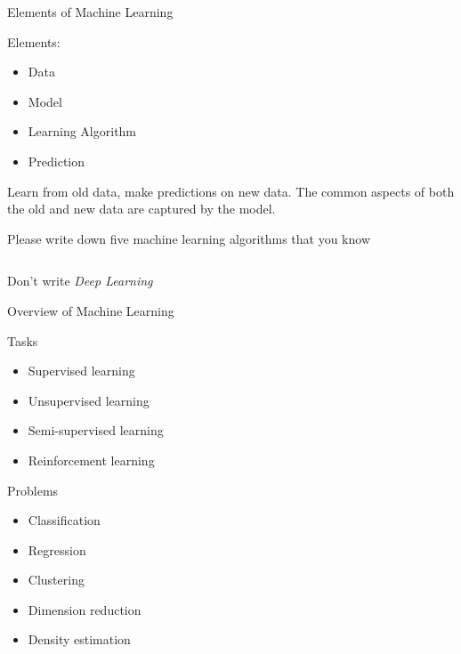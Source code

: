 \documentclass{beamer}
\newenvironment{witemize}{\itemize\addtolength{\itemsep}{15pt}}{\enditemize}
\begin{document}


\begin{frame}{Elements of Machine Learning}
\begin{witemize}
    \item Elements:
    \begin{itemize}
        \item Data
	    \item Model
        \item Learning Algorithm
        \item Prediction
    \end{itemize}
    \item Learn from old data, make predictions on new data. 
    The common aspects of both the old and new data are captured by the model.
\end{witemize}
\end{frame}



\begin{frame}{}

Please write down five machine learning algorithms that you know

$ $

Don't write \emph{Deep Learning}
\end{frame}




\begin{frame}{Overview of Machine Learning}
\begin{witemize}
    \item Tasks
    \begin{itemize}
        \item Supervised learning
	    \item Unsupervised learning
	    \item Semi-supervised learning
	    \item Reinforcement learning
    \end{itemize}
    \item Problems
    \begin{itemize}
        \item Classification
	    \item Regression
	    \item Clustering
	    \item Dimension reduction
	    \item Density estimation
    \end{itemize}
\end{witemize}
\end{frame}
\end{document}

